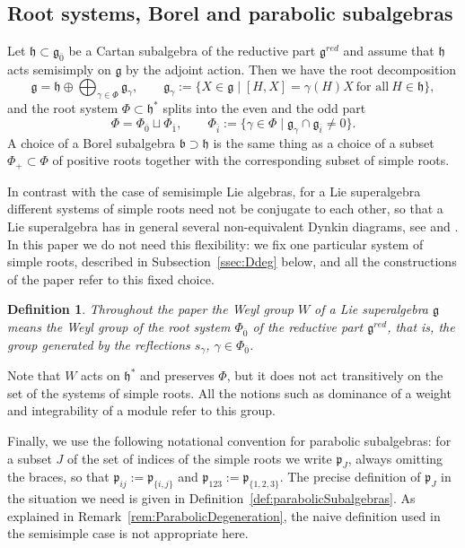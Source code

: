 \documentclass[10pt]{amsart}
\newtheorem{definition}[theorem]{Definition}
\newcommand{\fg}{{\mathfrak g}}
\newcommand{\fb}{{\mathfrak b}}
\newcommand{\fp}{{\mathfrak p}}
\newcommand{\fh}{{\mathfrak h}}
\begin{document}
	\subsection{Root systems, Borel and parabolic subalgebras}
	Let $\fh \subset \fg_{\overline 0}$ be a Cartan subalgebra of the reductive part $\fg^{red}$ and assume that $\fh$ acts semisimply on $\fg$ by the adjoint action. Then we have the root decomposition
	\[\fg=\fh \oplus \bigoplus_{\gamma \in \Phi}\fg_{\gamma},\qquad \fg_\gamma:=\{X \in \fg \mid [H,X]=\gamma(H)X ~\text{for all}~ H \in \fh\},\]
	and the root system $\Phi \subset \fh^*$ splits into the even and the odd part
	\[\Phi=\Phi_{\overline 0}\sqcup \Phi_{\overline 1},\qquad \Phi_{\overline i}:=\{\gamma \in \Phi\mid \fg_\gamma \cap \fg_{\overline i}\neq 0\}.\]
	A choice of a Borel subalgebra $\fb \supset \fh$ is the same thing as a choice of a subset $\Phi_+\subset \Phi$ of positive roots together with the corresponding subset of simple roots.
	
	In contrast with the case of semisimple Lie algebras, for a Lie superalgebra different systems of simple roots need not be conjugate to each other, so that a Lie superalgebra has in general several non-equivalent Dynkin diagrams, see \cite[Chapter~3]{DictionaryOn} and \cite{DrinfieldSecond}. In this paper we do not need this flexibility: we fix one particular system of simple roots, described in Subsection~\ref{ssec:Ddeg} below, and all the constructions of the paper refer to this fixed choice.
	
	\begin{definition}\label{def:WeylGroupConvention}
		Throughout the paper the {\it Weyl group} $W$ of a Lie superalgebra $\fg$ means the Weyl group of the root system $\Phi_{\overline 0}$ of the reductive part $\fg^{red}$, that is, the group generated by the reflections $s_\gamma$, $\gamma \in \Phi_{\overline 0}$.
	\end{definition}
	
	Note that $W$ acts on $\fh^*$ and preserves $\Phi$, but it does not act transitively on the set of the systems of simple roots. All the notions such as dominance of a weight and integrability of a module refer to this group.
	
	Finally, we use the following notational convention for parabolic subalgebras: for a subset $J$ of the set of indices of the simple roots we write $\fp_J$, always omitting the braces, so that $\fp_{ij}:=\fp_{\{i,j\}}$ and $\fp_{123}:=\fp_{\{1,2,3\}}$. The precise definition of $\fp_J$ in the situation we need is given in Definition~\ref{def:parabolicSubalgebras}. As explained in Remark~\ref{rem:ParabolicDegeneration}, the naive definition used in the semisimple case is not appropriate here.
	
\end{document}
